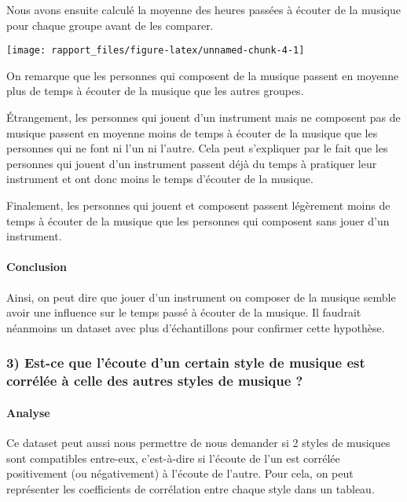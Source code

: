 \documentclass[
]{article}
\begin{document}
Nous avons ensuite calculé la moyenne des heures passées à écouter de la
musique pour chaque groupe avant de les comparer.

\begin{center}\texttt{[image: rapport\_files/figure-latex/unnamed-chunk-4-1]} \end{center}

On remarque que les personnes qui composent de la musique passent en
moyenne plus de temps à écouter de la musique que les autres groupes.

Étrangement, les personnes qui jouent d'un instrument mais ne composent
pas de musique passent en moyenne moins de temps à écouter de la musique
que les personnes qui ne font ni l'un ni l'autre. Cela peut s'expliquer
par le fait que les personnes qui jouent d'un instrument passent déjà du
temps à pratiquer leur instrument et ont donc moins le temps d'écouter
de la musique.

Finalement, les personnes qui jouent et composent passent légèrement
moins de temps à écouter de la musique que les personnes qui composent
sans jouer d'un instrument.

\paragraph{\texorpdfstring{\textbf{Conclusion}}{Conclusion}}\label{conclusion-1}

Ainsi, on peut dire que jouer d'un instrument ou composer de la musique
semble avoir une influence sur le temps passé à écouter de la musique.
Il faudrait néanmoins un dataset avec plus d'échantillons pour confirmer
cette hypothèse.

\subsubsection{3) Est-ce que l'écoute d'un certain style de musique est
corrélée à celle des autres styles de musique
?}\label{est-ce-que-luxe9coute-dun-certain-style-de-musique-est-corruxe9luxe9e-uxe0-celle-des-autres-styles-de-musique}

\paragraph{\texorpdfstring{\textbf{Analyse}}{Analyse}}\label{analyse-3}

Ce dataset peut aussi nous permettre de nous demander si 2 styles de
musiques sont compatibles entre-eux, c'est-à-dire si l'écoute de l'un
est corrélée positivement (ou négativement) à l'écoute de l'autre. Pour
cela, on peut représenter les coefficients de corrélation entre chaque
style dans un tableau.
\end{document}
